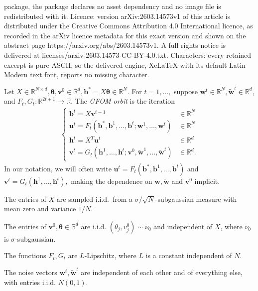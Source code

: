 \documentclass[10pt,a4paper]{amsart}
\newcommand{\R}{\mathbb{R}}
\newcommand{\bfb}{\boldsymbol{b}}
\newcommand{\bfh}{\boldsymbol{h}}
\newcommand{\bftheta}{\boldsymbol{\theta}}
\newcommand{\bfu}{\boldsymbol{u}}
\newcommand{\bfv}{\boldsymbol{v}}
\newcommand{\bfw}{\boldsymbol{w}}
\begin{document}
package, the package declares no asset dependency and no image file is redistributed with it. Licence: version arXiv:2603.14573v1 of this article is distributed under the Creative Commons Attribution 4.0 International licence, as recorded in the arXiv licence metadata for this exact version and shown on the abstract page https://arxiv.org/abs/2603.14573v1. A full rights notice is delivered at licenses/arxiv-2603.14573-CC-BY-4.0.txt. Characters: every retained excerpt is pure ASCII, so the delivered engine, XeLaTeX with its default Latin Modern text font, reports no missing character.
\begin{definition}\label{defn:GFOM}
    Let $X \in \R^{N\times d}, \bftheta, \bfv^0 \in \R^d,\bfb^* = X\bftheta \in \R^N.$ For $t=1,\dots,$ suppose $\bfw^t \in \R^N, \tilde{\bfw}^t \in \R^d$, and $F_t, G_t:\R^{2t + 1}\to \R$. The \emph{GFOM orbit} is the iteration
    \begin{align}\label{eq:GFOM-orbit}
        \begin{cases}
            \bfb^t = X \bfv^{t-1} &\in \R^N \\
            \bfu^t = F_t(\bfb^*, \bfb^1,\dots,\bfb^t; \bfw^1,\dots,\bfw^t) & \in \R^N \\
            \bfh^t = X^T \bfu^t &\in \R^d \\
            \bfv^t = G_t(\bfh^1,\dots,\bfh^t;\bfv^0,\tilde{\bfw}^1, \dots, \tilde{\bfw}^t) & \in \R^d.
        \end{cases}
    \end{align}
    In our notation, we will often write $\bfu^t = F_t(\bfb^*, \bfb^1,\dots,\bfb^t)$ and $\bfv^t = G_t(\bfh^1,\dots,\bfh^t),$ making the dependence on $\bfw,\tilde{\bfw}$ and $\bfv^0$ implicit.
\end{definition}

\begin{assumptions}
  \item\label{assump:1}
  The entries of $X$ are sampled i.i.d.\ from a $\sigma/\sqrt{N}$-subgaussian measure with mean zero and
  variance $1/N$.
  \item\label{assump:2} The entries of $\bfv^0,\bftheta \in \R^d$ are i.i.d. $(\theta_j,v^0_j)\sim\nu_0$ and independent of $X$, where $\nu_0$ is $\sigma$-subgaussian.
  \item \label{assump:3} The functions $F_t,G_t$ are $L$-Lipschitz, where $L$ is a constant independent of $N.$
  \item \label{assump:4} The noise vectors $\bfw^t,\tilde{\bfw}^t$ are independent of each other and of everything else, with entries i.i.d. $N(0,1).$
\end{assumptions}
\end{document}
